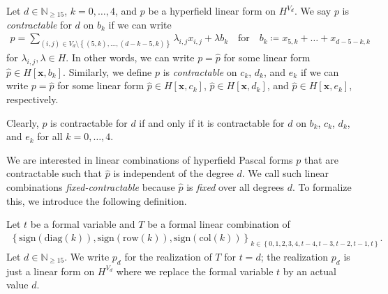 \begin{definition}
    Let \( d \in \mathbb{N}_{\geq 15} \), \( k = 0, \dots ,4 \), and \( p \) be a hyperfield linear form on \( H^{V_d} \). We say \( p \) is \emph{contractable} for \( d \) on \( b_k \) if we can write
    \begin{align*}
        p = \sum_{(i,j) \in V_d \setminus \left\{ (5,k), \dots, (d-k-5, k) \right\}} \lambda_{i,j} x_{i,j}  +\lambda b_k \quad \text{for} \quad b_k \coloneqq x_{5,k} + \dots + x_{d-5-k,k}
    \end{align*}
    for \( \lambda_{i,j}, \lambda \in H \). In other words, we can write \( p = \hat p \) for some linear form \( \hat p \in H[\mathbf{x}, b_k] \). 
    Similarly, we define \( p \) is \emph{contractable} on \( c_k \), \( d_k \), and \( e_k \) if we can write \( p = \hat p \) for some linear form \( \hat p \in H[\mathbf{x}, c_k] \), \( \hat p \in H[\mathbf{x}, d_k] \), and \( \hat p \in H[\mathbf{x}, e_k] \), respectively.
\end{definition}

\begin{remark}
    Clearly, \( p \) is contractable for \( d \) if and only if it is contractable for \( d \) on \( b_k \), \( c_k \), \( d_k \), and \( e_k \) for all \( k = 0, \dots, 4 \).
\end{remark}

We are interested in linear combinations of hyperfield Pascal forms \( p \) that are contractable such that \( \hat p \) is independent of the degree \( d \). We call such linear combinations \emph{fixed-contractable} because \( \hat p \) is \emph{fixed} over all degrees \( d \). To formalize this, we introduce the following definition.

\begin{definition}
    Let \( t \) be a formal variable and \( T \) be a formal linear combination of
    \begin{align*}
        \left\{ \mathrm{sign}(\mathrm{diag}(k)), \mathrm{sign}(\mathrm{row}(k)), \mathrm{sign}(\mathrm{col}(k)) \right\}_{k \in \left\{ 0,1,2,3,4,t-4,t-3,t-2,t-1,t \right\}}.
    \end{align*}
    Let \( d \in \mathbb{N}_{\geq 15}\). We write \( p_d \) for the realization of \( T \) for \( t = d \); the realization \( p_d \) is just a linear form on \( H^{V_d} \) where we replace the formal variable \( t \) by an actual value \( d \).
\end{definition}


\pagebreak

